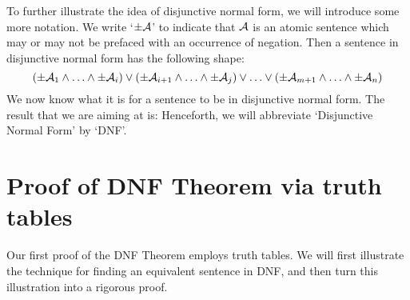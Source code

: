 To further illustrate the idea of disjunctive normal form, we will introduce some more notation. We write `$\pm\mathcal{A}$' to indicate that $\mathcal{A}$ is an atomic sentence which may or may not be prefaced with an occurrence of negation. Then a sentence in disjunctive normal form has the following shape:
	$$(\pm \mathcal{A}_1 \land \ldots \land \pm \mathcal{A}_i) \lor (\pm \mathcal{A}_{i+1} \land \ldots \land \pm\mathcal{A}_j) \lor \ldots \lor (\pm\mathcal{A}_{m+1} \land \ldots \land \pm \mathcal{A}_n)$$
We now know what it is for a sentence to be in disjunctive normal form. The result that we are aiming at is:
Henceforth, we will abbreviate `Disjunctive Normal Form' by `DNF'. 


\section{Proof of DNF Theorem via truth tables}
\label{s:DNFTruthTable}

Our first proof of the DNF Theorem employs truth tables. We will first illustrate the technique for finding an equivalent sentence in DNF, and then turn this illustration into a rigorous proof. 

